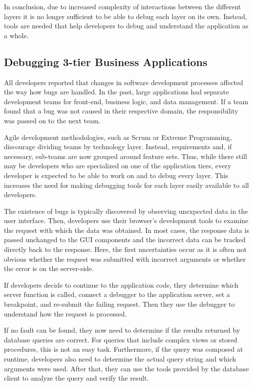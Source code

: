 In conclusion, due to increased complexity of interactions between the different layers it is no longer sufficient to be able to debug each layer on its own.
Instead, tools are needed that help developers to debug and understand the application as a whole.

\subsection{Debugging 3-tier Business Applications}

All developers reported that changes in software development processes affected the way how bugs are handled.
In the past, large applications had separate development teams for front-end, business logic, and data management.
If a team found that a bug was not caused in their respective domain, the responsibility was passed on to the next team.

Agile development methodologies, such as Scrum or Extreme Programming, discourage dividing teams by technology layer.
Instead, requirements and, if necessary, sub-teams are now grouped around feature sets.
Thus, while there still may be developers who are specialized on one of the application tiers, every developer is expected to be able to work on and to debug every layer.
This increases the need for making debugging tools for each layer easily available to all developers.

The existence of bugs is typically discovered by observing unexpected data in the user interface.
Then, developers use their browser's development tools to examine the request with which the data was obtained.
In most cases, the response data is passed unchanged to the GUI components and the incorrect data can be tracked directly back to the response.
Here, the first uncertainties occur as it is often not obvious whether the request was submitted with incorrect arguments or whether the error is on the server-side.

If developers decide to continue to the application code, they determine which server function is called, connect a debugger to the application server, set a breakpoint, and re-submit the failing request.
Then they use the debugger to understand how the request is processed.

If no fault can be found, they now need to determine if the results returned by database queries are correct.
For queries that include complex views or stored procedures, this is not an easy task.
Furthermore, if the query was composed at runtime, developers also need to determine the actual query string and which arguments were used.
After that, they can use the tools provided by the database client to analyze the query and verify the result.

